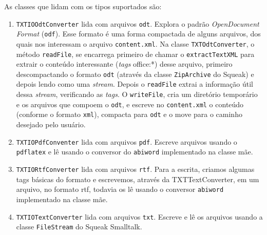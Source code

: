 As classes que lidam com os tipos suportados são:
\begin{enumerate}
\item \verb|TXTIOOdtConverter| lida com arquivos \verb|odt|. Explora o
  padrão \textit{OpenDocument Format} (\verb|odf|). Esse formato é uma
  forma compactada de alguns arquivos, dos quais nos interessam o
  arquivo \verb|content.xml|. Na classe \verb|TXTOdtConverter|, o
  método \verb|readFile|, se encarrega primeiro de chamar o
  \verb|extractTextXML| para extrair o conteúdo interessante
  (\textit{tags} office:*) desse arquivo, primeiro descompactando o
  formato \verb|odt| (através da classe \verb|ZipArchive| do Squeak) e
  depois lendo como uma \textit{stream}. Depois o \verb|readFile|
  extrai a informação útil dessa \textit{stream}, verificando as
  \textit{tags}. O \verb|writeFile|, cria um diretório temporário e os
  arquivos que compoem o \verb|odt|, e escreve no \verb|content.xml| o
  conteúdo (conforme o formato \verb|xml|), compacta para \verb|odt| e
  o move para o caminho desejado pelo usuário.
\item \verb|TXTIOPdfConventer| lida com arquivos \verb|pdf|. Escreve
  arquivos usando o \verb|pdflatex| e lê usando o conversor do
  \verb|abiword| implementado na classe mãe.
\item \verb|TXTIORtfConverter| lida com arquivos \verb|rtf|. Para a
  escrita, criamos algumas tags básicas do formato e escrevemos,
  através da TXTTextConverter, em um arquivo, no formato rtf, todavia
  os lê usando o conversor \verb|abiword| implementado na classe mãe.
\item \verb|TXTIOTextConverter| lida com arquivos \verb|txt|. Escreve
  e lê os arquivos usando a classe \verb|FileStream| do Squeak
  Smalltalk.
\end{enumerate}
